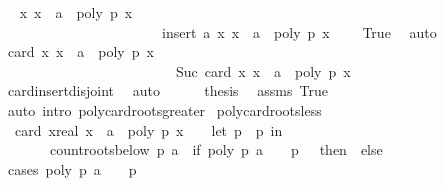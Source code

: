 \begin{isabellebody}
\ \isamarkupfalse%
\ {\isachardoublequoteopen}{\isacharbraceleft}x{\isachardot}\ x\ {\isasymge}\ a\ {\isasymand}\ poly\ p\ x\ {\isacharequal}\ {}{\isacharbraceright}\ {\isacharequal}\ \isanewline
\ \ \ \ \ \ \ \ \ \ \ \ \ \ \ \ \ \ \ \ \ \ \ insert\ a\ {\isacharbraceleft}x{\isachardot}\ x\ {\isachargreater}\ a\ {\isasymand}\ poly\ p\ x\ {\isacharequal}\ {}{\isacharbraceright}{\isachardoublequoteclose}\ \isamarkupfalse%
\ True\ \isamarkupfalse%
\ auto\isanewline
\ \ \ \ \isamarkupfalse%
\ \isamarkupfalse%
\ {\isachardoublequoteopen}card\ {\isacharbraceleft}x{\isachardot}\ x\ {\isasymge}\ a\ {\isasymand}\ poly\ p\ x\ {\isacharequal}\ {}{\isacharbraceright}\ {\isacharequal}\ \isanewline
\ \ \ \ \ \ \ \ \ \ \ \ \ \ \ \ \ \ \ \ \ \ \ \ \ Suc\ {\isacharparenleft}card\ {\isacharbraceleft}x{\isachardot}\ x\ {\isachargreater}\ a\ {\isasymand}\ poly\ p\ x\ {\isacharequal}\ {}{\isacharbraceright}{\isacharparenright}{\isachardoublequoteclose}\isanewline
\ \ \ \ \ \ \ \ \isamarkupfalse%
\ card{\isacharunderscore}insert{\isacharunderscore}disjoint\ \isamarkupfalse%
\ auto\isanewline
\ \ \ \ \isamarkupfalse%
\ {\isacharquery}thesis\ \isamarkupfalse%
\ assms\ True\ \isamarkupfalse%
\ {\isacharparenleft}auto\ intro{\isacharcolon}\ poly{\isacharunderscore}card{\isacharunderscore}roots{\isacharunderscore}greater{\isacharparenright}\isanewline
{}\isamarkupfalse%
%
\endisatagproof
{\isafoldproof}%
%
\isadelimproof
\isanewline
%
\endisadelimproof
\isanewline
{}\isamarkupfalse%
\ poly{\isacharunderscore}card{\isacharunderscore}roots{\isacharunderscore}less{\isacharcolon}\isanewline
\ \ {\isachardoublequoteopen}card\ {\isacharbraceleft}x{\isacharcolon}{\isacharcolon}real{\isachardot}\ x\ {\isacharless}\ a\ {\isasymand}\ poly\ p\ x\ {\isacharequal}\ {}{\isacharbraceright}\ {\isacharequal}\ {\isacharparenleft}let\ p\ {\isacharequal}\ p\ in\isanewline
\ \ \ \ \ \ \ count{\isacharunderscore}roots{\isacharunderscore}below\ p\ a\ {\isacharminus}\ {\isacharparenleft}if\ poly\ p\ a\ {\isacharequal}\ {}\ {\isasymand}\ p\ {\isasymnoteq}\ {}\ then\ {}\ else\ {}{\isacharparenright}{\isacharparenright}{\isachardoublequoteclose}\isanewline
%
\isadelimproof
%
\endisadelimproof
%
\isatagproof
{}\isamarkupfalse%
\ {\isacharparenleft}cases\ {\isachardoublequoteopen}poly\ p\ a\ {\isacharequal}\ {}\ {\isasymand}\ p\ {\isasymnoteq}\ {}{\isachardoublequoteclose}{\isacharparenright}\isanewline

\end{isabellebody}
